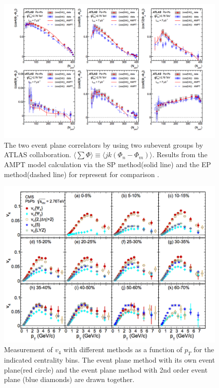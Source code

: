 \begin{figure}[h]
\centerline{\includegraphics[width=12.0cm]{figures/atlas_eventcorr}}
\caption{ The two event plane correlators by using two subevent groups by ATLAS collaboration. $\langle \sum \Phi \rangle \equiv \langle jk(\Phi_n - \Phi_m) \rangle$.  Results from the AMPT model calculation via the SP method(solid line) and the EP method(dashed line) for represent for comparison \cite{Aad:2014fla}.} 
\label{fig:atlas}
\end{figure}


\begin{figure}[h]
\centerline{\includegraphics[width=12.0cm]{figures/cms_vn_evt}}
\caption{ Measurement of $v_4$ with different methods as a function of $p_T$ for the indicated centrality bins. The event plane method with its own event plane(red circle) and the event plane method with 2nd order event plane (blue diamonds) are drawn together.\cite{Chatrchyan:2013kba} } 
\label{fig:cmsevtp}
\end{figure}

